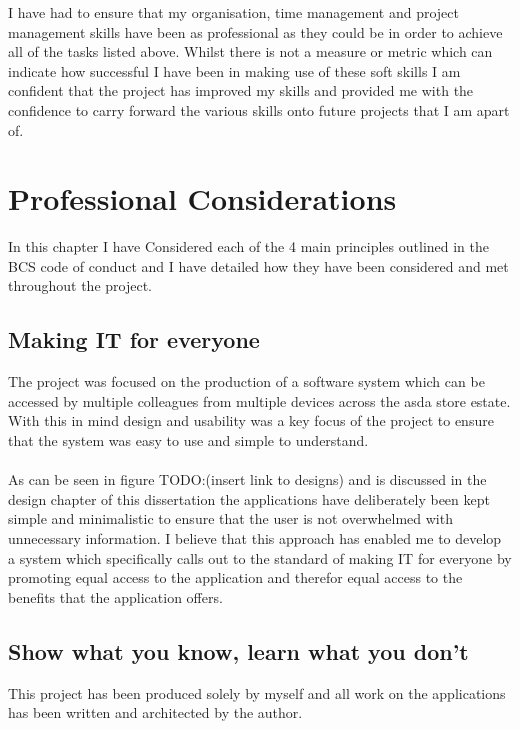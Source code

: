 \documentclass[a4paper,11pt]{report}
\begin{document}
I have had to ensure that my organisation, time management and project management skills have been as professional as they could be in order to achieve all of the tasks listed above. 
Whilst there is not a measure or metric which can indicate how successful I have been in making use of these soft skills I am confident that the project has improved my skills and provided me with the confidence to carry forward the various skills onto future projects that I am apart of.

\chapter{Professional Considerations}

In this chapter I have Considered each of the 4 main principles outlined in the BCS code of conduct and I have detailed how they have been considered and met throughout the project. 

\section{Making IT for everyone}
The project was focused on the production of a software system which can be accessed by multiple colleagues from multiple devices across the asda store estate.
 With this in mind design and usability was a key focus of the project to ensure that the system was easy to use and simple to understand. 
 \\
 \\
 As can be seen in figure TODO:(insert link to designs) and is discussed in the design chapter of this dissertation the applications have deliberately been kept simple and minimalistic to ensure that the user is not overwhelmed with unnecessary information.
  I believe that this approach has enabled me to develop a system which specifically calls out to the standard of making IT for everyone by promoting equal access to the application and therefor equal access to the benefits that the application offers. 
\section{Show what you know, learn what you don't}
This project has been produced solely by myself and all work on the applications has been written and architected by the author. 
\end{document}
